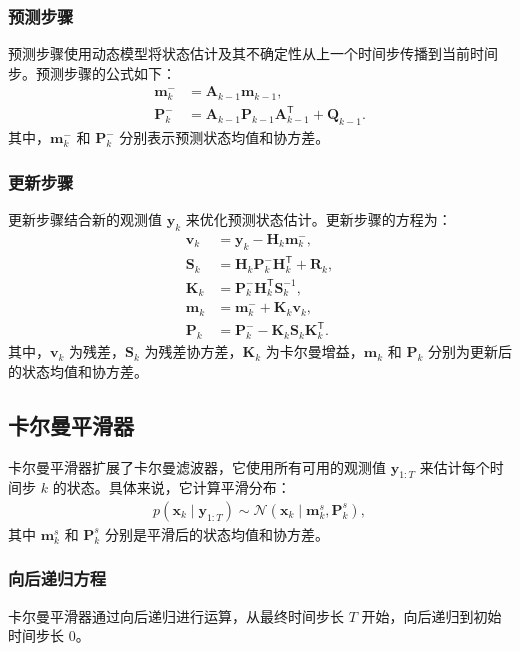 \subsubsection*{预测步骤}
预测步骤使用动态模型将状态估计及其不确定性从上一个时间步传播到当前时间步。预测步骤的公式如下：
\begin{align*}
\mathbf{m}_k^- &= \mathbf{A}_{k-1} \mathbf{m}_{k-1}, \\
\mathbf{P}_k^- &= \mathbf{A}_{k-1} \mathbf{P}_{k-1} \mathbf{A}_{k-1}^\mathsf{T} + \mathbf{Q}_{k-1}.
\end{align*}
其中，\(\mathbf{m}_k^-\) 和 \(\mathbf{P}_k^-\) 分别表示预测状态均值和协方差。

\subsubsection*{更新步骤}
更新步骤结合新的观测值 \(\mathbf{y}_k\) 来优化预测状态估计。更新步骤的方程为：
\begin{align}
 \mathbf{v}_k &= \mathbf{y}_k - \mathbf{H}_k \mathbf{m}_k^-, \label{eq: kalman filter vk} \\
 \mathbf{S}_k &= \mathbf{H}_k \mathbf{P}_k^- \mathbf{H}_k^\mathsf{T} + \mathbf{R}_k, \label{eq: kalman filter Sk} \\
 \mathbf{K}_k &= \mathbf{P}_k^- \mathbf{H}_k^\mathsf{T} \mathbf{S}_k^{-1}, \\
\mathbf{m}_k &= \mathbf{m}_k^- + \mathbf{K}_k \mathbf{v}_k, \\
\mathbf{P}_k &= \mathbf{P}_k^- - \mathbf{K}_k \mathbf{S}_k \mathbf{K}_k^\mathsf{T}.
\end{align}
其中，\(\mathbf{v}_k\) 为残差，\(\mathbf{S}_k\) 为残差协方差，\(\mathbf{K}_k\) 为卡尔曼增益，\(\mathbf{m}_k\) 和 \(\mathbf{P}_k\) 分别为更新后的状态均值和协方差。

\subsection{卡尔曼平滑器}
卡尔曼平滑器扩展了卡尔曼滤波器，它使用所有可用的观测值 \(\mathbf{y}_{1:T}\) 来估计每个时间步 \(k\) 的状态。具体来说，它计算平滑分布：
\begin{align*}
p(\mathbf{x}_k \mid \mathbf{y}_{1:T}) \sim \mathcal{N}(\mathbf{x}_k \mid \mathbf{m}_k^s, \mathbf{P}_k^s),
\end{align*}
其中 \(\mathbf{m}_k^s\) 和 \(\mathbf{P}_k^s\) 分别是平滑后的状态均值和协方差。

\subsubsection*{向后递归方程}
卡尔曼平滑器通过向后递归进行运算，从最终时间步长 \(T\) 开始，向后递归到初始时间步长 \(0\)。

